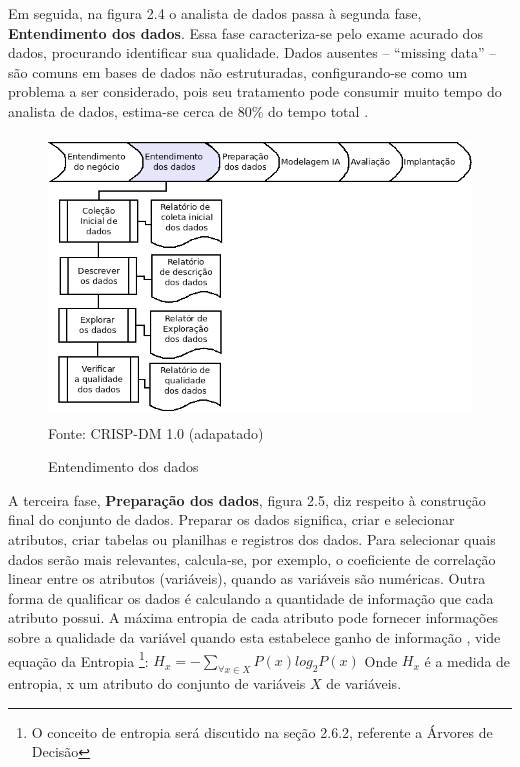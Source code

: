 
\vspace{0.5cm}

Em seguida, na figura 2.4 o analista de dados passa à segunda fase, \textbf{Entendimento dos dados}. Essa fase caracteriza-se pelo exame acurado dos dados, procurando identificar sua qualidade. 
Dados ausentes -- ``missing data'' -- são comuns em bases de dados não estruturadas, configurando-se como
um problema a ser considerado, pois seu tratamento pode consumir muito tempo do analista de dados, estima-se cerca de 80\% do tempo total \cite{DataMining}. 

\begin{figure}[!ht]
\centering
\caption{Entendimento dos dados}
\vspace{1mm}
\includegraphics[width=120mm, height=75mm]{Figuras/Cronograma/EntendDados.png}\\
\tiny Fonte: CRISP-DM 1.0 (adapatado)
\end{figure}

\pagebreak


A terceira fase, \textbf{Preparação dos dados}, figura 2.5, diz respeito à construção final do conjunto de dados. 
Preparar os dados significa, criar e selecionar atributos, criar tabelas ou planilhas e registros dos dados.
Para selecionar quais dados serão mais relevantes, calcula-se, por exemplo, o coeficiente de correlação linear entre os atributos (variáveis), quando as variáveis são numéricas. Outra forma de qualificar os dados é calculando a quantidade de informação que cada atributo possui. A máxima entropia de cada atributo pode fornecer informações sobre a qualidade da variável quando esta estabelece ganho de informação \cite{NorvigRussel2004}, vide equação da Entropia \footnote{O conceito de entropia será discutido na seção 2.6.2, referente a Árvores de Decisão}: $ H_{x}=-\sum_{\forall x \in X}P(x)log_{2}P(x) $
Onde $ H_{x} $ é a medida de entropia, x um atributo do conjunto de variáveis $X$ de variáveis. 


